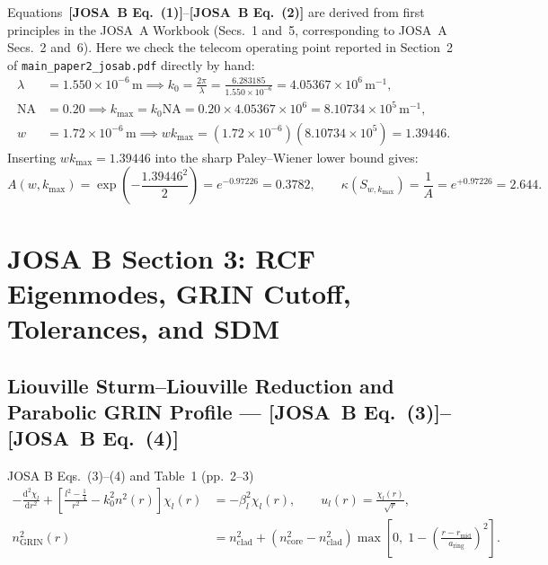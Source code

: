 \documentclass[10pt,letterpaper]{article}
\newcommand{\dd}{\mathrm{d}}
\newcommand{\josb}[1]{\textbf{[JOSA~B Eq.~(#1)]}}
\numberwithin{equation}{section}
\begin{document}
Equations~\josb{1}--\josb{2} are derived from first principles in the JOSA~A Workbook (Secs.~1 and~5, corresponding to JOSA~A Secs.~2 and~6). Here we check the telecom operating point reported in Section~2 of \texttt{main\_paper2\_josab.pdf} directly by hand:
\begin{align}
  \lambda &= 1.550\times 10^{-6}\,\mathrm{m} \implies k_0 = \frac{2\pi}{\lambda} = \frac{6.283185}{1.550\times 10^{-6}} = 4.05367\times 10^6\,\mathrm{m}^{-1}, \\
  \mathrm{NA} &= 0.20 \implies k_{\max} = k_0\mathrm{NA} = 0.20\times 4.05367\times 10^6 = 8.10734\times 10^5\,\mathrm{m}^{-1}, \\
  w &= 1.72\times 10^{-6}\,\mathrm{m} \implies w k_{\max} = (1.72\times 10^{-6})(8.10734\times 10^5) = \mathbf{1.39446}.
\end{align}
Inserting $w k_{\max} = 1.39446$ into the sharp Paley--Wiener lower bound gives:
\begin{equation}
  A(w,k_{\max}) = \exp\!\left(-\frac{1.39446^2}{2}\right) = e^{-0.97226} = \mathbf{0.3782}, \qquad
  \kappa(S_{w,k_{\max}}) = \frac{1}{A} = e^{+0.97226} = \mathbf{2.644}.
\end{equation}

\section{JOSA B Section 3: RCF Eigenmodes, GRIN Cutoff, Tolerances, and SDM}
\label{sec:b3}

\subsection{Liouville Sturm--Liouville Reduction and Parabolic GRIN Profile --- \josb{3}--\josb{4}}
\label{sec:b3_rcf}

\begin{targeteq}{JOSA B Eqs.~(3)--(4) and Table~1 (pp.~2--3)}
\begin{align*}
  -\frac{\dd^2\chi_l}{\dd r^2} + \left[\frac{l^2 - \frac{1}{4}}{r^2} - k_0^2 n^2(r)\right]\chi_l(r) &= -\beta_l^2\chi_l(r), \qquad u_l(r) = \frac{\chi_l(r)}{\sqrt{r}}, \\
  n_{\mathrm{GRIN}}^2(r) &= n_{\mathrm{clad}}^2 + (n_{\mathrm{core}}^2 - n_{\mathrm{clad}}^2)\max\!\left[0,\; 1 - \left(\frac{r - r_{\mathrm{mid}}}{a_{\mathrm{ring}}}\right)^2\right].
\end{align*}
\end{targeteq}
\end{document}
